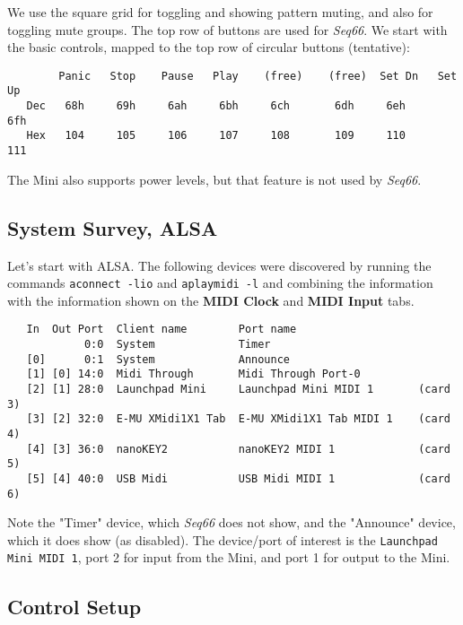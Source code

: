    We use the square grid for toggling and showing pattern muting, and also for
   toggling mute groups.
   The top row of buttons are used for \textsl{Seq66}. We start with the basic
   controls, mapped to the top row of circular buttons (tentative):

   \begin{verbatim}
        Panic   Stop    Pause   Play    (free)    (free)  Set Dn   Set Up
   Dec   68h     69h     6ah     6bh     6ch       6dh     6eh      6fh
   Hex   104     105     106     107     108       109     110      111
   \end{verbatim}

   The Mini also supports power levels, but that feature is not used by
   \textsl{Seq66}.

\subsection{System Survey, ALSA}
\label{subsec:launchpad_mini_survey_alsa}

   Let's start with ALSA.  The following devices were discovered by running the
   commands \texttt{aconnect -lio} and \texttt{aplaymidi -l} and combining the
   information with the information shown on the
   \textbf{MIDI Clock} and \textbf{MIDI Input} tabs.

   \begin{verbatim}
   In  Out Port  Client name        Port name
            0:0  System             Timer
   [0]      0:1  System             Announce
   [1] [0] 14:0  Midi Through       Midi Through Port-0
   [2] [1] 28:0  Launchpad Mini     Launchpad Mini MIDI 1       (card 3)
   [3] [2] 32:0  E-MU XMidi1X1 Tab  E-MU XMidi1X1 Tab MIDI 1    (card 4)
   [4] [3] 36:0  nanoKEY2           nanoKEY2 MIDI 1             (card 5)
   [5] [4] 40:0  USB Midi           USB Midi MIDI 1             (card 6)
   \end{verbatim}

   Note the "Timer" device, which \textsl{Seq66} does not show, and the
   "Announce" device, which it does show (as disabled).  The device/port of
   interest is the \texttt{Launchpad Mini MIDI 1}, port 2 for input from
   the Mini, and port 1 for output to the Mini.

\subsection{Control Setup}
\label{subsec:launchpad_mini_control_setup}

